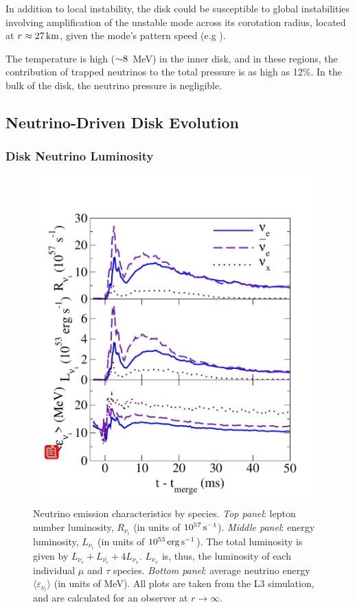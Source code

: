 In addition to local instability, the disk could be susceptible to global
instabilities involving amplification of the unstable mode across its corotation
radius, located at $r \approx 27\rm\,km$, given the mode's pattern
speed (e.g \citealt{papa1985-rot_stability}).

The temperature is high ($\mathord{\sim} 8$~MeV) in the inner disk, and in these
regions, the contribution of trapped neutrinos to the total pressure is as
high as 12\%.  In the bulk of the disk, the neutrino pressure is
negligible.

\subsection{Neutrino-Driven Disk Evolution}
\label{sec:neutrinodisk}

\subsubsection{Disk Neutrino Luminosity}

\begin{figure}
\centering
\includegraphics[width=11cm]{Figures/neutrinos_by_species}
\caption[Neutrinos emission characteristics by species]{
Neutrino emission characteristics by species.
{\em Top panel}: lepton number luminosity, $R_{\nu_i}$
(in units of $10^{57}\rm\,s^{-1}$).
{\em Middle panel}: energy luminosity, $L_{\nu_i}$
(in units of $10^{53}\rm\,erg\,s^{-1}$).
The total luminosity is given by $L_{\nu_e}+L_{\bar{\nu_e}}+4L_{\nu_x}$. 
$L_{\nu_x}$ is, thus, the luminosity of each individual $\mu$ and $\tau$
species.
{\em Bottom panel}: average neutrino energy $\langle \varepsilon_{\nu_i} \rangle$
(in units of MeV).
All plots are taken from the L3 simulation, and are calculated for
an observer at $r \rightarrow \infty$.
}
\label{fig:neutrinos_by_species}
\end{figure}

